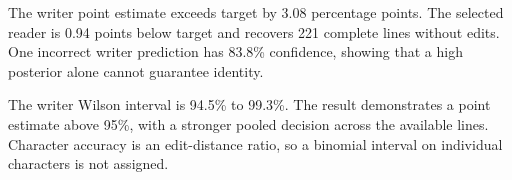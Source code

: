
The writer point estimate exceeds target by 3.08 percentage points. The selected reader is 0.94 points below target and recovers 221 complete lines without edits. One incorrect writer prediction has 83.8\% confidence, showing that a high posterior alone cannot guarantee identity.




The writer Wilson interval is 94.5\% to 99.3\%. The result demonstrates a point estimate above 95\%, with a stronger pooled decision across the available lines. Character accuracy is an edit-distance ratio, so a binomial interval on individual characters is not assigned.



